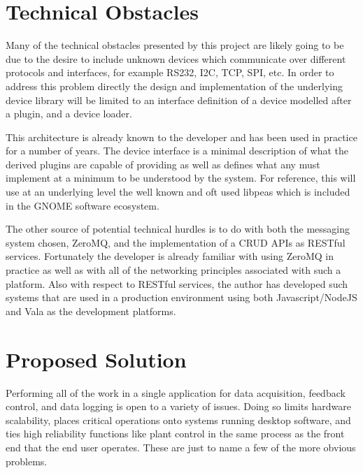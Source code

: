 \documentclass[11pt]{article}
\begin{document}
  \section{Technical Obstacles}\label{sec:tech-obstacles}

    Many of the technical obstacles presented by this project are likely going
    to be due to the desire to include unknown devices which communicate over
    different protocols and interfaces, for example RS232, I2C, TCP, SPI, etc.
    In order to address this problem directly the design and implementation of
    the underlying device library will be limited to an interface definition
    of a device modelled after a plugin, and a device loader.

    This architecture is already known to the developer and has been used in
    practice for a number of years. The device interface is a minimal
    description of what the derived plugins are capable of providing as well
    as defines what any must implement at a minimum to be understood by the
    system. For reference, this will use at an underlying level the well known
    and oft used libpeas which is included in the GNOME software ecosystem.

    The other source of potential technical hurdles is to do with both the
    messaging system chosen, ZeroMQ, and the implementation of a CRUD APIs
    as RESTful services. Fortunately the developer is already familiar with
    using ZeroMQ in practice as well as with all of the networking principles
    associated with such a platform. Also with respect to RESTful services,
    the author has developed such systems that are used in a production
    environment using both Javascript/NodeJS and Vala as the development
    platforms.

  \section{Proposed Solution}\label{sec:soln}

    Performing all of the work in a single application for data acquisition,
    feedback control, and data logging is open to a variety of issues. Doing so
    limits hardware scalability, places critical operations onto systems running
    desktop software, and ties high reliability functions like plant control in
    the same process as the front end that the end user operates. These are just
    to name a few of the more obvious problems.
\end{document}
